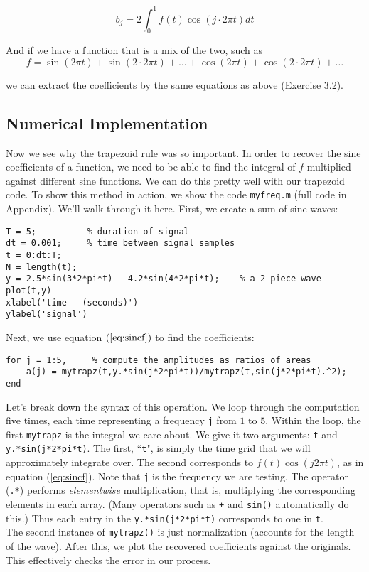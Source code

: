 \documentclass{article}
\begin{document}
\begin{equation}
\label{eq:coscf}
b_j = 2 \int_{0}^1f(t)\cos(j \cdot 2\pi t)dt
\end{equation}

And if we have a function that is a mix of the two, such as
\[f = \sin(2\pi t)+ \sin(2\cdot2\pi t) +\dots + \cos(2\pi t)+ \cos(2\cdot2\pi t) +\dots\]

we can extract the coefficients by the same equations as above (Exercise 3.2).


\subsection{Numerical Implementation}
Now we see why the trapezoid rule was so important.  In order to recover the sine coefficients of a function, we need to be able to find the integral of $f$ multiplied against different sine functions.  We can do this pretty well with our trapezoid code.  To show this method in action, we show the code {\tt myfreq.m} (full code in Appendix).  We'll walk through it here.  First, we create a sum of sine waves:

\begin{verbatim}
T = 5;			% duration of signal
dt = 0.001;     % time between signal samples
t = 0:dt:T;
N = length(t);
y = 2.5*sin(3*2*pi*t) - 4.2*sin(4*2*pi*t);    % a 2-piece wave
plot(t,y)
xlabel('time   (seconds)')
ylabel('signal')
\end{verbatim}


Next, we use equation $(\ref{eq:sincf})$ to find the coefficients:
\begin{verbatim}
for j = 1:5,     % compute the amplitudes as ratios of areas
    a(j) = mytrapz(t,y.*sin(j*2*pi*t))/mytrapz(t,sin(j*2*pi*t).^2);
end
\end{verbatim}

Let's break down the syntax of this operation.  We loop through the computation five times, each time representing a frequency {\tt j} from $1$ to $5$.  Within the loop, the first {\tt mytrapz} is the integral we care about.  We give it two arguments: {\tt t} and {\tt y.*sin(j*2*pi*t)}.  The first, ``{\tt t}", is simply the time grid that we will approximately integrate over.  The second corresponds to $f(t)\cos(j 2\pi t)$, as in equation (\ref{eq:sincf}).  Note that {\tt j} is the frequency we are testing.  The operator ({\tt .*}) performs {\it elementwise} multiplication, that is, multiplying the corresponding elements in each array.  (Many operators such as {\tt +} and {\tt sin()} automatically do this.)  Thus each entry in the {\tt y.*sin(j*2*pi*t)} corresponds to one in {\tt t}.\\
   The second instance of {\tt mytrapz()} is just normalization (accounts for the length of the wave).  After this, we plot the recovered coefficients against the originals.  This effectively checks the error in our process.
\end{document}
